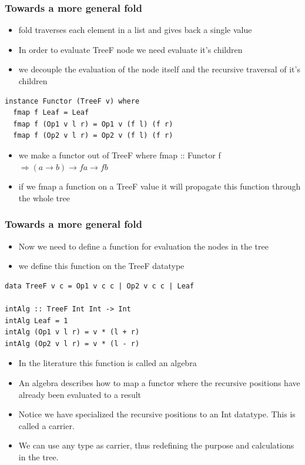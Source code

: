 \documentclass[10pt]{beamer}
\begin{document}
\begin{frame}[fragile]
\frametitle{Towards a more general fold}
\begin{itemize}
\item fold traverses each element in a list and gives back a single value 
\item In order to evaluate TreeF node we need evaluate it's children
\item we decouple the evaluation of the node itself and the recursive traversal of it's children	
\end{itemize}

\begin{lstlisting}
instance Functor (TreeF v) where
  fmap f Leaf = Leaf
  fmap f (Op1 v l r) = Op1 v (f l) (f r)
  fmap f (Op2 v l r) = Op2 v (f l) (f r)
\end{lstlisting}


\begin{itemize}
\item we make a functor out of TreeF where fmap :: Functor f $ \Rightarrow (a \rightarrow b) \rightarrow f a \rightarrow f b$
\item if we fmap a function on a TreeF value it will propagate this function through the whole tree 
\end{itemize}

\end{frame}



\begin{frame}[fragile]
\frametitle{Towards a more general fold}
\begin{itemize}
\item Now we need to define a function for evaluation the nodes in the tree 
\item we define this function on the TreeF datatype 
\end{itemize}

\begin{lstlisting}
data TreeF v c = Op1 v c c | Op2 v c c | Leaf

intAlg :: TreeF Int Int -> Int
intAlg Leaf = 1
intAlg (Op1 v l r) = v * (l + r)
intAlg (Op2 v l r) = v * (l - r)
\end{lstlisting}


\begin{itemize}
\item In the literature this function is called an algebra
\item An algebra describes how to map a functor where the recursive positions have already been evaluated to a result
\item Notice we have specialized the recursive positions to an Int datatype. This is called a carrier. 	
\item We can use any type as carrier, thus redefining the purpose and calculations in the tree. 	
\end{itemize}

\end{frame}
\end{document}
